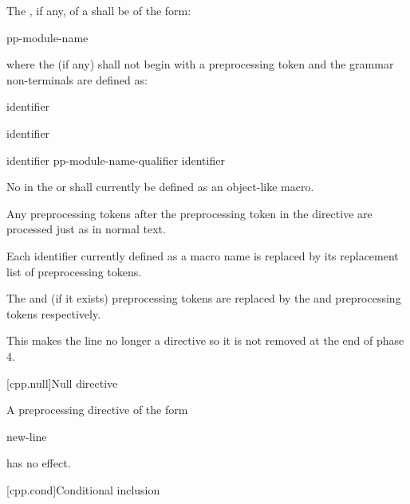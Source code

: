 \pnum
The , if any, of a 
shall be of the form:
\begin{ncsimplebnf}
pp-module-name  
\end{ncsimplebnf}
where the  (if any) shall not begin with
a \tcode{(} preprocessing token and
the grammar non-terminals are defined as:
\begin{ncbnf}
\br
     identifier
\end{ncbnf}
\begin{ncbnf}
\br
    \terminal{:}  identifier
\end{ncbnf}
\begin{ncbnf}
\br
    identifier \br
    pp-module-name-qualifier identifier 
\end{ncbnf}
No  in
the  or 
shall currently be defined as an object-like macro.

\pnum
Any preprocessing tokens after the  preprocessing token
in the  directive are processed just as in normal text.
\begin{note}
Each identifier currently defined as a macro name
is replaced by its replacement list of preprocessing tokens.
\end{note}

\pnum
The  and  (if it exists) preprocessing tokens
are replaced by the  and
 preprocessing tokens respectively.
\begin{note}
This makes the line no longer a directive
so it is not removed at the end of phase 4.
\end{note}

[cpp.null]{Null directive}%

\pnum
A preprocessing directive of the form
\begin{ncsimplebnf}
\terminal{\#} new-line
\end{ncsimplebnf}
has no effect.

[cpp.cond]{Conditional inclusion}%
%

